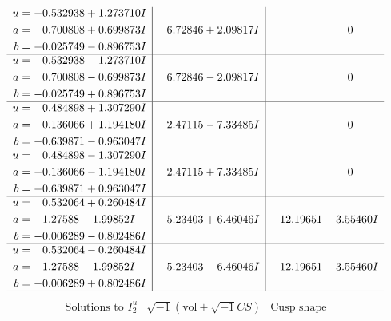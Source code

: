 \documentclass[1p]{elsarticle_modified}
\theoremstyle{definition}
\newcommand{\I}{\sqrt{-1}}
\begin{document}
$$\begin{array}{c|c|c}
\begin{aligned}
u &= -0.532938 + 1.273710 I \\
a &= \phantom{-}0.700808 + 0.699873 I \\
b &= -0.025749 - 0.896753 I\end{aligned}
 & \phantom{-}6.72846 + 2.09817 I & \phantom{-0.000000 } 0 \\ \hline\begin{aligned}
u &= -0.532938 - 1.273710 I \\
a &= \phantom{-}0.700808 - 0.699873 I \\
b &= -0.025749 + 0.896753 I\end{aligned}
 & \phantom{-}6.72846 - 2.09817 I & \phantom{-0.000000 } 0 \\ \hline\begin{aligned}
u &= \phantom{-}0.484898 + 1.307290 I \\
a &= -0.136066 + 1.194180 I \\
b &= -0.639871 - 0.963047 I\end{aligned}
 & \phantom{-}2.47115 - 7.33485 I & \phantom{-0.000000 } 0 \\ \hline\begin{aligned}
u &= \phantom{-}0.484898 - 1.307290 I \\
a &= -0.136066 - 1.194180 I \\
b &= -0.639871 + 0.963047 I\end{aligned}
 & \phantom{-}2.47115 + 7.33485 I & \phantom{-0.000000 } 0 \\ \hline\begin{aligned}
u &= \phantom{-}0.532064 + 0.260484 I \\
a &= \phantom{-}1.27588 - 1.99852 I \\
b &= -0.006289 - 0.802486 I\end{aligned}
 & -5.23403 + 6.46046 I & -12.19651 - 3.55460 I \\ \hline\begin{aligned}
u &= \phantom{-}0.532064 - 0.260484 I \\
a &= \phantom{-}1.27588 + 1.99852 I \\
b &= -0.006289 + 0.802486 I\end{aligned}
 & -5.23403 - 6.46046 I & -12.19651 + 3.55460 I\\
 \hline 
 \end{array}$$\newpage$$\begin{array}{c|c|c}  
\text{Solutions to }I^u_{2}& \I (\text{vol} + \sqrt{-1}CS) & \text{Cusp shape}\\
 \hline 
\begin{aligned}

\end{aligned}
\end{array}$$
\end{document}
